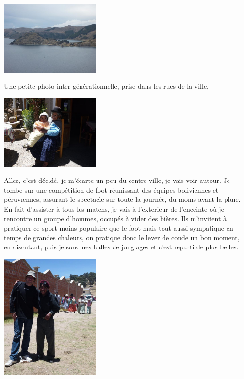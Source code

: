 \begin{multicols}{2}
\smallbreak
\hspace*{-0.65cm}
\includegraphics[width=5cm]{articles/Arequipa-colca-titicaca/125660697038LL.jpg}
\smallbreak

Une petite photo inter générationnelle, prise dans les rues de la ville.

\smallbreak
\hspace*{-0.65cm}
\includegraphics[width=5cm]{articles/Arequipa-colca-titicaca/1256606974OTlv.jpg}
\smallbreak

Allez, c'est décidé, je m'écarte un peu du centre ville, je vais voir autour. Je tombe sur une compétition de foot réunissant des équipes boliviennes et péruviennes, assurant le spectacle sur toute la journée, du moins avant la pluie. En fait d'assister à tous les matchs, je vais à l'exterieur de l'enceinte où je rencontre un groupe d'hommes, occupés à vider des bières. Ils m'invitent à pratiquer ce sport moins populaire que le foot mais tout aussi sympatique en temps de grandes chaleurs, on pratique donc le lever de coude un bon moment, en discutant, puis je sors mes balles de jonglages et c'est reparti de plus belles.

\smallbreak
\hspace*{-0.65cm}
\includegraphics[width=5cm]{articles/Arequipa-colca-titicaca/1256606985kcoP.jpg}
\smallbreak


\end{multicols}
